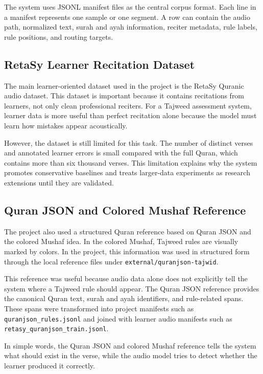 The system uses JSONL manifest files as the central corpus format. Each line in
a manifest represents one sample or one segment. A row can contain the audio
path, normalized text, surah and ayah information, reciter metadata, rule labels,
rule positions, and routing targets.

\subsection{RetaSy Learner Recitation Dataset}

The main learner-oriented dataset used in the project is the RetaSy Quranic
audio dataset. This dataset is important because it contains recitations from
learners, not only clean professional reciters. For a Tajweed assessment system,
learner data is more useful than perfect recitation alone because the model must
learn how mistakes appear acoustically.

However, the dataset is still limited for this task. The number of distinct
verses and annotated learner errors is small compared with the full Quran, which
contains more than six thousand verses. This limitation explains why the system
promotes conservative baselines and treats larger-data experiments as research
extensions until they are validated.

\subsection{Quran JSON and Colored Mushaf Reference}

The project also used a structured Quran reference based on Quran JSON and the
colored Mushaf idea. In the colored Mushaf, Tajweed rules are visually marked by
colors. In the project, this information was used in structured form through the
local reference files under \texttt{external/quranjson-tajwid}.

This reference was useful because audio data alone does not explicitly tell the
system where a Tajweed rule should appear. The Quran JSON reference provides the
canonical Quran text, surah and ayah identifiers, and rule-related spans. These
spans were transformed into project manifests such as
\texttt{quranjson\_rules.jsonl} and joined with learner audio manifests such as
\texttt{retasy\_quranjson\_train.jsonl}.

In simple words, the Quran JSON and colored Mushaf reference tells the system
what should exist in the verse, while the audio model tries to detect whether
the learner produced it correctly.

